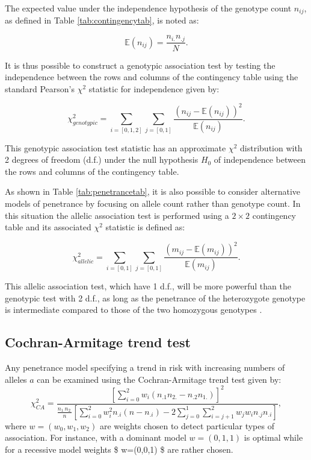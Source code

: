 \documentclass[]{book}
\begin{document}
The expected value under the independence hypothesis of the genotype
count \(n_{ij}\), as defined in Table \ref{tab:contingencytab}, is noted as:

\[\mathbb{E}(n_{ij}) = \frac{n_{i.} n_{.j}}{N}.\]

It is thus possible to construct a genotypic association test by testing
the independence between the rows and columns of the contingency table
using the standard Pearson's \(\chi^2\) statistic for independence given
by:

\[\chi^2_{genotypic} = \sum_{i=[0,1,2]} \sum_{j = [0,1]}  \frac{(n_{ij} - \mathbb{E}(n_{ij}))^2}{\mathbb{E}(n_{ij})}.\]

This genotypic association test statistic has an approximate \(\chi^2\)
distribution with 2 degrees of freedom (d.f.) under the null hypothesis
\(H_0\) of independence between the rows and columns of the contingency
table.

As shown in Table \ref{tab:penetrancetab}, it is also possible to consider
alternative models of penetrance by focusing on allele count rather than
genotype count. In this situation the allelic association test is
performed using a \(2 \times 2\) contingency table and its associated
\(\chi^2\) statistic is defined as:

\[\chi^2_{allelic} = \sum_{i=[0,1]} \sum_{j = [0,1]}  \frac{(m_{ij} - \mathbb{E}(m_{ij}))^2}{\mathbb{E}(m_{ij})}.\]

This allelic association test, which have 1 d.f., will be more powerful
than the genotypic test with 2 d.f., as long as the penetrance of the
heterozygote genotype is intermediate compared to those of the two
homozygous genotypes \citep{clarke2011basic}.

\hypertarget{cochran-armitage-trend-test}{%
\subsection{Cochran-Armitage trend test}\label{cochran-armitage-trend-test}}

Any penetrance model specifying a trend in risk with increasing numbers
of alleles \(a\) can be examined using the Cochran-Armitage trend test
\citep{cochran1954some, armitage1955tests} given by:
\[\chi^2_{CA} = \dfrac{ \left[ \sum_{i=0}^2 w_i(n_{.1}n_{2.} - n_{.2}n_{1.}) \right]^2}{\frac{n_{1.}n_{2.}}{n} \left[ \sum_{i=0}^2 w_i^2n_{.i}(n-n_{.i}) - 2\sum_{j=0}^1\sum_{i=j+1}^2 w_j w_i n_{.j} n_{.i} \right]},
\label{eq:CAtrend}\] where \(w = (w_0,w_1,w_2)\) are weights chosen to
detect particular types of association. For instance, with a dominant
model \(w = (0,1,1)\) is optimal while for a recessive model weights
\$ w=(0,0,1) \$ are rather chosen.
\end{document}
